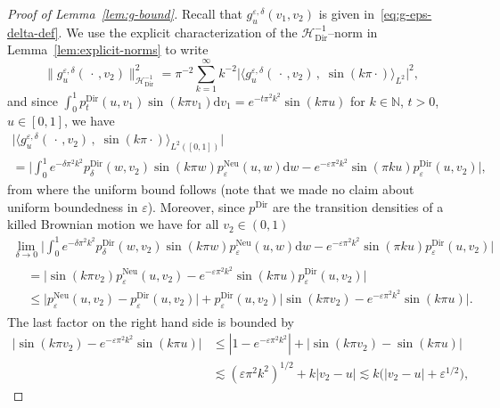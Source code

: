 \documentclass[AHL,Unicode,longabstracts]{cedram}
\DeclareMathOperator{\Dir}{Dir}
\DeclareMathOperator{\Neu}{Neu}
\newcommand{\bb}[1]{{\mathbb #1}}
\newcommand{\mc}[1]{{\mathcal #1}}
\renewcommand{\mc}[1]{{\mathcal #1}}
\renewcommand{\leq}{\leqslant}
\newcommand*{\dd}{\mathrm{d}}
\newcommand*{\dv}{\dd v}
\newcommand*{\dw}{\dd w}
\begin{document}
\begin{proof}[Proof of Lemma~\ref{lem:g-bound}]
Recall that $g^{\varepsilon, \delta}_u (v_1, v_2)$ is given in~\eqref{eq:g-eps-delta-def}. We use the explicit characterization of the $\mc H_{\Dir}^{- 1}$--norm in Lemma~\ref{lem:explicit-norms} to write
\[
\big\| g^{\varepsilon, \delta}_u (\,\cdot\,, v_2) \big\|_{\mc H_{\Dir}^{- 1}}^2 = \pi^{-2}
\sum_{k = 1}^{\infty} k^{- 2} \big| \big\langle g^{\varepsilon, \delta}_u (\,\cdot\,, v_2) \,,\; \sin (k \pi \cdot) \big\rangle_{L^2} \big|^2,
\]
and since $\int_0^1 p^{\Dir}_{t} (u, v_1) \sin (k \pi v_1) \dv_1 = e^{- t \pi^2 k^2} \sin (k \pi u)$ for $k \in \bb N$, $t > 0$, $u \in [0,1]$, we have
\begin{multline*}
\big| \big\langle g^{\varepsilon, \delta}_u (\,\cdot\,, v_2) \,, \; \sin (k \pi \cdot) \big\rangle_{L^2([0,1])} \big| \\ = \bigg| \int_0^1 e^{- \delta \pi^2 k^2} p^{\Dir}_{\delta} (w, v_2) \sin (k \pi w) p^{\Neu}_{\varepsilon} (u, w) \dw - e^{- \varepsilon \pi^2 k^2} \sin(\pi k u) p^{\Dir}_{\varepsilon} (u, v_2) \bigg|,
\end{multline*}
from where the uniform bound follows (note that we made no claim about uniform boundedness in $\varepsilon$). Moreover, since $p^{\Dir}$ are the transition densities of a killed Brownian motion we have for all $v_2 \in (0,1)$
\begin{multline*}
\lim_{\delta \rightarrow 0} \bigg| \int_0^1 e^{- \delta \pi^2 k^2} p^{\Dir}_{\delta} (w, v_2) \sin (k \pi w) p^{\Neu}_{\varepsilon} (u, w) \dw - e^{- \varepsilon \pi^2 k^2} \sin(\pi k u) p^{\Dir}_{\varepsilon} (u, v_2) \bigg|\\
\begin{aligned}
&= \bigg| \sin (k \pi v_2) p^{\Neu}_{\varepsilon} (u, v_2) - e^{- \varepsilon
\pi^2 k^2} \sin (k \pi u) p^{\Dir}_{\varepsilon} (u, v_2) \bigg|\\
&\leq \big| p^{\Neu}_{\varepsilon} (u, v_2) - p^{\Dir}_{\varepsilon} (u, v_2) \big| + p^{\Dir}_{\varepsilon} (u, v_2) \big| \sin (k \pi v_2) - e^{- \varepsilon \pi^2 k^2} \sin (k \pi u)\big|.
\end{aligned}
\end{multline*}
The last factor on the right hand side is bounded by
\begin{align*}
\big| \sin (k \pi v_2) - e^{- \varepsilon \pi^2 k^2} \sin (k \pi u)\big| & \leq |1 - e^{- \varepsilon \pi^2 k^2}| + \big| \sin (k \pi v_2) - \sin (k \pi u) \big|\\
& \lesssim (\varepsilon \pi^2 k^2)^{1/2} + k |v_2 - u| \lesssim k \big(| v_2 - u | + \varepsilon^{1/2}\big),

\end{align*}
\end{proof}
\end{document}
